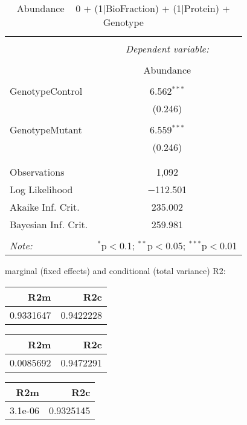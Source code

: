 \documentclass[11pt]{report}
\begin{document}
\begin{table}[!htbp] \centering 
  \caption{Abundance ~ 0 + (1|BioFraction) + (1|Protein) + Genotype} 
  \label{} 
\begin{tabular}{@{\extracolsep{5pt}}lc} 
\\[-1.8ex]\hline 
\hline \\[-1.8ex] 
 & \multicolumn{1}{c}{\textit{Dependent variable:}} \\ 
\cline{2-2} 
\\[-1.8ex] & Abundance \\ 
\hline \\[-1.8ex] 
 GenotypeControl & 6.562$^{***}$ \\ 
  & (0.246) \\ 
  & \\ 
 GenotypeMutant & 6.559$^{***}$ \\ 
  & (0.246) \\ 
  & \\ 
\hline \\[-1.8ex] 
Observations & 1,092 \\ 
Log Likelihood & $-$112.501 \\ 
Akaike Inf. Crit. & 235.002 \\ 
Bayesian Inf. Crit. & 259.981 \\ 
\hline 
\hline \\[-1.8ex] 
\textit{Note:}  & \multicolumn{1}{r}{$^{*}$p$<$0.1; $^{**}$p$<$0.05; $^{***}$p$<$0.01} \\ 
\end{tabular} 
\end{table} 
marginal (fixed effects) and conditional (total variance) R2:

\begin{tabular}{r|r}
\hline
R2m & R2c\\
\hline
0.9331647 & 0.9422228\\
\hline
\end{tabular}

\begin{tabular}{r|r}
\hline
R2m & R2c\\
\hline
0.0085692 & 0.9472291\\
\hline
\end{tabular}

\begin{tabular}{r|r}
\hline
R2m & R2c\\
\hline
3.1e-06 & 0.9325145\\
\hline
\end{tabular}
\end{document}
